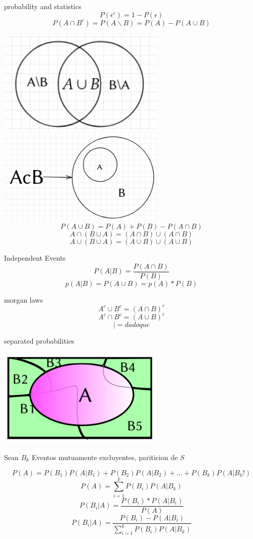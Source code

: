 \newpage
\begin{section}{probability and statistics}
	$$P(\epsilon^{c})=1-P(\epsilon)$$	
	$$P(A \cap B^{c}) =P(A \backslash B) =  P(A) - P(A \cup B)$$

	\includegraphics[width=8cm]{1.png}
	\includegraphics[width=8cm]{2.png}
	$$P(A \cup B) =P(A) + P(B) - P(A \cap B) $$
	$$ A \cap (B \cup A ) = (A \cap B) \cup (A \cap B) $$
	$$ A \cup (B \cup A ) = (A \cup B) \cup (A \cup B) $$


	\begin{subsection}{Independent Events}
	$$ P(A|B) = \frac{P(A \cap B )} { P(B) }$$
	$$ p(A|B) =  P(A \cup B) = p(A)*P(B) $$
	\end{subsection}

	\begin{subsection}{morgan laws}
	$$ A^{c} \cup B^{c} = (A \cap B)^{c} $$
	$$ A^{c} \cap B^{c} = (A \cup B)^{c} $$
	$$ | = dado que $$
	\newpage
	\end{subsection}
	\begin{subsection}{separated probabilities}
	\begin{center}

	\includegraphics[width=8cm]{3.png}

	Sean $B_k$ Eventos mutuamente excluyentes, pariticion de $S$

	\end{center}
	$$P(A) = P(B_1)P(A|B_1) + P(B_2)P(A|B_2) + ... + P(B_k)P(A|B_k!)$$
	$$P(A) = \sum_{i=1}^{k}P(B_i)P(A|B_k)$$
	$$P(B_i|A) = \frac{ P(B_i)*P(A|B_i) }{ P(A) } $$
	$$P(B_i|A) = \frac{P(B_i) - P(A|B_i)}{\sum\limits_{i=1}^{k}P(B_i)P(A|B_k)}$$
	\end{subsection}




\end{section}
